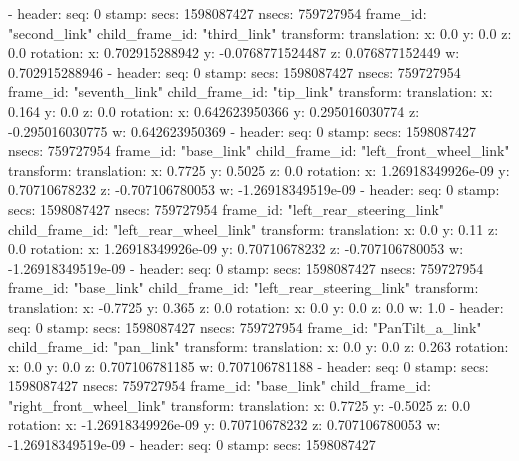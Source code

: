   - 
    header: 
      seq: 0
      stamp: 
        secs: 1598087427
        nsecs: 759727954
      frame_id: "second_link"
    child_frame_id: "third_link"
    transform: 
      translation: 
        x: 0.0
        y: 0.0
        z: 0.0
      rotation: 
        x: 0.702915288942
        y: -0.0768771524487
        z: 0.076877152449
        w: 0.702915288946
  - 
    header: 
      seq: 0
      stamp: 
        secs: 1598087427
        nsecs: 759727954
      frame_id: "seventh_link"
    child_frame_id: "tip_link"
    transform: 
      translation: 
        x: 0.164
        y: 0.0
        z: 0.0
      rotation: 
        x: 0.642623950366
        y: 0.295016030774
        z: -0.295016030775
        w: 0.642623950369
  - 
    header: 
      seq: 0
      stamp: 
        secs: 1598087427
        nsecs: 759727954
      frame_id: "base_link"
    child_frame_id: "left_front_wheel_link"
    transform: 
      translation: 
        x: 0.7725
        y: 0.5025
        z: 0.0
      rotation: 
        x: 1.26918349926e-09
        y: 0.70710678232
        z: -0.707106780053
        w: -1.26918349519e-09
  - 
    header: 
      seq: 0
      stamp: 
        secs: 1598087427
        nsecs: 759727954
      frame_id: "left_rear_steering_link"
    child_frame_id: "left_rear_wheel_link"
    transform: 
      translation: 
        x: 0.0
        y: 0.11
        z: 0.0
      rotation: 
        x: 1.26918349926e-09
        y: 0.70710678232
        z: -0.707106780053
        w: -1.26918349519e-09
  - 
    header: 
      seq: 0
      stamp: 
        secs: 1598087427
        nsecs: 759727954
      frame_id: "base_link"
    child_frame_id: "left_rear_steering_link"
    transform: 
      translation: 
        x: -0.7725
        y: 0.365
        z: 0.0
      rotation: 
        x: 0.0
        y: 0.0
        z: 0.0
        w: 1.0
  - 
    header: 
      seq: 0
      stamp: 
        secs: 1598087427
        nsecs: 759727954
      frame_id: "PanTilt_a_link"
    child_frame_id: "pan_link"
    transform: 
      translation: 
        x: 0.0
        y: 0.0
        z: 0.263
      rotation: 
        x: 0.0
        y: 0.0
        z: 0.707106781185
        w: 0.707106781188
  - 
    header: 
      seq: 0
      stamp: 
        secs: 1598087427
        nsecs: 759727954
      frame_id: "base_link"
    child_frame_id: "right_front_wheel_link"
    transform: 
      translation: 
        x: 0.7725
        y: -0.5025
        z: 0.0
      rotation: 
        x: -1.26918349926e-09
        y: 0.70710678232
        z: 0.707106780053
        w: -1.26918349519e-09
  - 
    header: 
      seq: 0
      stamp: 
        secs: 1598087427
